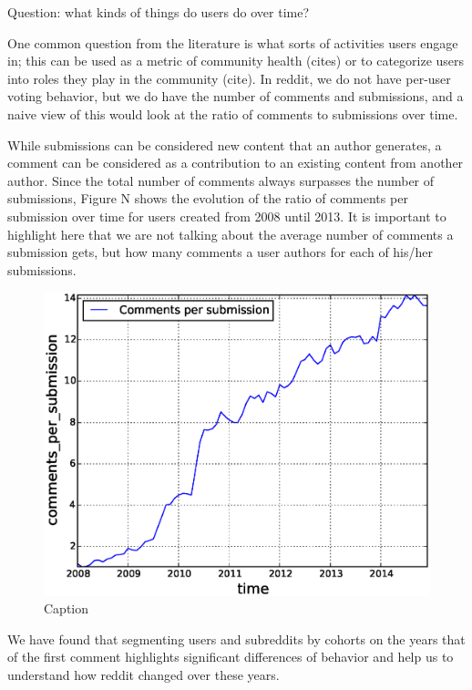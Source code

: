 Question: what kinds of things do users do over time?

One common question from the literature is what sorts of activities users engage in; this can be used as a metric of community health (cites) or to categorize users into roles they play in the community (cite).  In reddit, we do not have per-user voting behavior, but we do have the number of comments and submissions, and a naive view of this would look at the ratio of comments to submissions over time.

While submissions can be considered new content that an author generates, a comment can be considered as a contribution to an existing content from another author. Since the total number of comments always surpasses the number of submissions, Figure N shows the evolution of the ratio of comments per submission over time for users created from 2008 until 2013. It is important to highlight here that we are not talking about the average number of comments a submission gets, but how many comments a user authors for each of his/her submissions.

\begin{figure}[!tb]
\centering
\includegraphics[scale=0.4]{./images/comments_per_submissions_over_time_total.eps}
\caption{Caption}
\label{fig:comments_per_submissions_over_time_total}
\end{figure}

We have found that segmenting users and subreddits by cohorts on the years that of the first comment highlights significant differences of behavior and help us to understand how reddit changed over these years.


